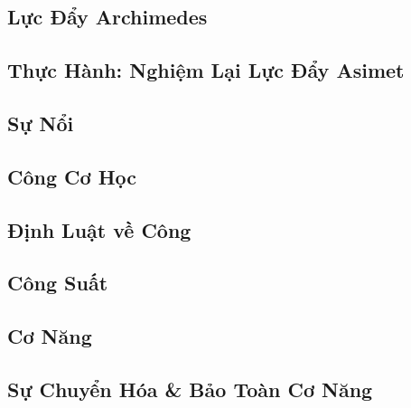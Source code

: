 \documentclass{article}
\numberwithin{equation}{section}
\begin{document}

\subsection{Lực Đẩy Archimedes}


\subsection{Thực Hành: Nghiệm Lại Lực Đẩy Asimet}


\subsection{Sự Nổi}


\subsection{Công Cơ Học}


\subsection{Định Luật về Công}


\subsection{Công Suất}


\subsection{Cơ Năng}


\subsection{Sự Chuyển Hóa \& Bảo Toàn Cơ Năng}
\end{document}

